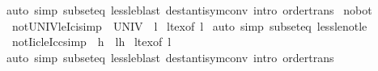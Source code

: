 \begin{isabellebody}
\isamarkupfalse%
{\isacharparenleft}{\kern0pt}auto\ simp{\isacharcolon}{\kern0pt}\ subset{\isacharunderscore}{\kern0pt}eq\ less{\isacharunderscore}{\kern0pt}le{\isacharparenright}{\kern0pt}{\isacharparenleft}{\kern0pt}blast\ dest{\isacharcolon}{\kern0pt}antisym{\isacharunderscore}{\kern0pt}conv\ intro{\isacharcolon}{\kern0pt}\ order{\isacharunderscore}{\kern0pt}trans{\isacharparenright}{\kern0pt}%
\endisatagproof
{\isafoldproof}%
%
\isadelimproof
\isanewline
%
\endisadelimproof
\isanewline
{}\isamarkupfalse%
\isanewline
\isanewline
{}\isamarkupfalse%
\ no{\isacharunderscore}{\kern0pt}bot\isanewline
{}\isanewline
\isanewline
{}\isamarkupfalse%
\ not{\isacharunderscore}{\kern0pt}UNIV{\isacharunderscore}{\kern0pt}le{\isacharunderscore}{\kern0pt}Ici{\isacharbrackleft}{\kern0pt}simp{\isacharbrackright}{\kern0pt}{\isacharcolon}{\kern0pt}\ {\isachardoublequoteopen}{\isasymnot}\ UNIV\ {\isasymsubseteq}\ {\isacharbraceleft}{\kern0pt}l{\isachardot}{\kern0pt}{\isachardot}{\kern0pt}{\isacharbraceright}{\kern0pt}{\isachardoublequoteclose}\isanewline
%
\isadelimproof
%
\endisadelimproof
%
\isatagproof
{}\isamarkupfalse%
\ lt{\isacharunderscore}{\kern0pt}ex{\isacharbrackleft}{\kern0pt}of\ l{\isacharbrackright}{\kern0pt}\ \isamarkupfalse%
{\isacharparenleft}{\kern0pt}auto\ simp{\isacharcolon}{\kern0pt}\ subset{\isacharunderscore}{\kern0pt}eq\ less{\isacharunderscore}{\kern0pt}le{\isacharunderscore}{\kern0pt}not{\isacharunderscore}{\kern0pt}le{\isacharparenright}{\kern0pt}%
\endisatagproof
{\isafoldproof}%
%
\isadelimproof
\isanewline
%
\endisadelimproof
\isanewline
{}\isamarkupfalse%
\ not{\isacharunderscore}{\kern0pt}Iic{\isacharunderscore}{\kern0pt}le{\isacharunderscore}{\kern0pt}Icc{\isacharbrackleft}{\kern0pt}simp{\isacharbrackright}{\kern0pt}{\isacharcolon}{\kern0pt}\ {\isachardoublequoteopen}{\isasymnot}\ {\isacharbraceleft}{\kern0pt}{\isachardot}{\kern0pt}{\isachardot}{\kern0pt}h{\isacharbraceright}{\kern0pt}\ {\isasymsubseteq}\ {\isacharbraceleft}{\kern0pt}l{\isacharprime}{\kern0pt}{\isachardot}{\kern0pt}{\isachardot}{\kern0pt}h{\isacharprime}{\kern0pt}{\isacharbraceright}{\kern0pt}{\isachardoublequoteclose}\isanewline
%
\isadelimproof
%
\endisadelimproof
%
\isatagproof
{}\isamarkupfalse%
\ lt{\isacharunderscore}{\kern0pt}ex{\isacharbrackleft}{\kern0pt}of\ l{\isacharprime}{\kern0pt}{\isacharbrackright}{\kern0pt}\isanewline
{}\isamarkupfalse%
{\isacharparenleft}{\kern0pt}auto\ simp{\isacharcolon}{\kern0pt}\ subset{\isacharunderscore}{\kern0pt}eq\ less{\isacharunderscore}{\kern0pt}le{\isacharparenright}{\kern0pt}{\isacharparenleft}{\kern0pt}blast\ dest{\isacharcolon}{\kern0pt}antisym{\isacharunderscore}{\kern0pt}conv\ intro{\isacharcolon}{\kern0pt}\ order{\isacharunderscore}{\kern0pt}trans{\isacharparenright}{\kern0pt}%

\end{isabellebody}

